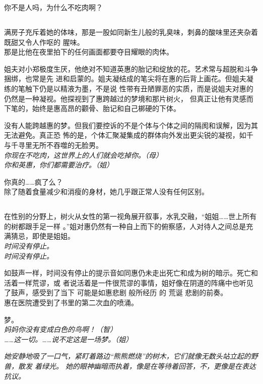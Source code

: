 \documentclass[a5paper, twoside]{article}
\let\oldemph\emph
\renewcommand{\emph}[1]{{\oldemph{#1}}}
\begin{document}
你不是人吗，为什么不吃肉啊？

\subsection{}

满房子充斥着她的体味，那是一股如同新生儿般的乳臭味，刺鼻的酸味里还夹杂着既甜又令人作呕的
腥味。
\\那是比他在夜里拍下的任何画面都要夺目耀眼的肉体。

姐夫对小郑极度生厌，他绝对不知道英惠的胎记和绽放的花。艺术常与超脱和斗争捆绑，也常是先
进和启蒙的。姐夫凝结成的笔尖将在惠的后背上画花。但姐夫凝练的笔触下仍是以精液为墨，不是说
性带有丑陋罪恶的实质，而是说姐夫对惠的仍然是一种凝视。他探视到了惠跨越过的梦境和那片树火，
但真正让他有灵感而下笔的，始终是惠高昂的颧骨、胎记和自己梆硬的下体。

没有人能跨越惠的梦。但我们要控诉的不是个体与个体之间的隔阂和误解，因为其无法避免。真正恐
怖的是，个体汇聚凝集成的群体向外发出更尖锐的凝视，如千与千寻里无所不吞噬的无脸男。
\\\emph{你现在不吃肉，这世界上的人们就会吃掉你。（母）}
\\\emph{你和英惠，你们都需要治疗。（姐）}

你真的……疯了么？
\\除了随着食量减少和消瘦的身材，她几乎跟正常人没有任何区别。

\subsection{}

在性别的分野上，树火从女性的第一视角展开叙事，水乳交融，“姐姐……世上所有的树都跟手足一样
。”姐对惠仍然有一种自上而下的俯察感，人对待人之间总是充满猜忌，即使是姐姐。
\\\emph{时间没有停止。}
\\\emph{时间没有停止。}

如鼓声一样，时间没有停止的提示音如同惠仍未走出死亡和成为树的暗示。死亡和活着一样荒谬，或
者说活着是一件很荒谬的事情，姐好像在阴道的阵痛中也听见了鼓声，感受到了当下
可能是如惠悲剧
般所经历
的
荒诞
悲剧的前奏。\\惠在医院遭受到了书里的第二次血的喷涌。

梦。
\\\emph{妈妈你没有变成白色的鸟啊！（智）}
\\\emph{……这一切。……说不定这是一场梦。（姐）}

\emph{她安静地吸了一口气，紧盯着路边“熊熊燃烧”的树木，它们就像无数头站立起的野兽，散发
着绿光。
她的眼神幽暗而执着，像是在等待着回答，不，更像是在表达抗议。}
\end{document}
